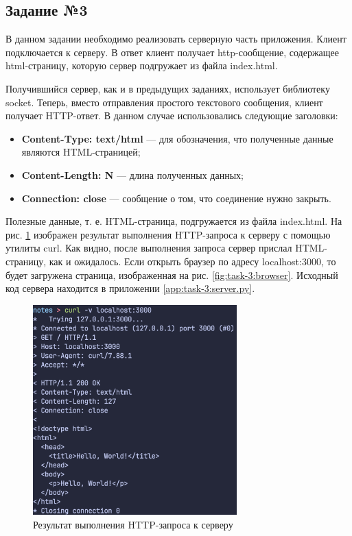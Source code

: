 \documentclass[a4paper, 14pt]{extarticle}
\begin{document}
\subsection*{Задание №3}

В данном задании необходимо реализовать серверную часть приложения. Клиент
подключается к серверу. В ответ клиент получает http-сообщение, содержащее
html-страницу, которую сервер подгружает из файла index.html.

Получившийся сервер, как и в предыдущих заданиях, использует библиотеку socket.
Теперь, вместо отправления простого текстового сообщения, клиент получает
HTTP-ответ. В данном случае использовались следующие заголовки:
\begin{itemize}
  \item \textbf{Content-Type: text/html} --- для обозначения, что полученные
  данные являются HTML-страницей;
  \item \textbf{Content-Length: N} --- длина полученных данных;
  \item \textbf{Connection: close} --- сообщение о том, что соединение нужно
  закрыть.
\end{itemize}
Полезные данные, т. е. HTML-страница, подгружается из файла index.html. На рис.
\ref{fig:task-3:curl} изображен результат выполнения HTTP-запроса к серверу с
помощью утилиты curl. Как видно, после выполнения запроса сервер прислал
HTML-страницу, как и ожидалось. Если открыть браузер по адресу localhost:3000,
то будет загружена страница, изображенная на рис. \ref{fig:task-3:browser}.
Исходный код сервера находится в приложении \ref{app:task-3:server.py}.

\begin{figure}[H]
  \centering
  \includegraphics[width=0.7\textwidth]{images/task-3/curl.png}
  \caption{Результат выполнения HTTP-запроса к серверу}
  \label{fig:task-3:curl}
\end{figure}
\end{document}
